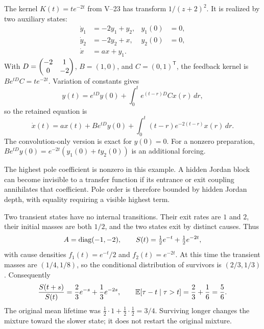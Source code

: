 The kernel $K(t)=te^{-2t}$ from V--23 has transform $1/(z+2)^2$. It is realized by two auxiliary states:
\[
\begin{aligned}
\dot y_1&=-2y_1+y_2,& y_1(0)&=0,\\
\dot y_2&=-2y_2+x,& y_2(0)&=0,\\
\dot x&=a x+y_1.&
\end{aligned}
\]
With $D=\begin{pmatrix}-2&1\\0&-2\end{pmatrix}$, $B=(1,0)$, and $C=(0,1)^{\mathsf T}$, the feedback kernel is $Be^{tD}C=te^{-2t}$.
Variation of constants gives
\[
y(t)=e^{tD}y(0)+\int_0^t e^{(t-r)D}Cx(r)\,dr,
\]
so the retained equation is
\[
\dot x(t)=a x(t)+Be^{tD}y(0)
+\int_0^t (t-r)e^{-2(t-r)}x(r)\,dr.
\]
The convolution-only version is exact for $y(0)=0$. For a nonzero preparation, $Be^{tD}y(0)=e^{-2t}(y_1(0)+t y_2(0))$ is an additional forcing.

The highest pole coefficient is nonzero in this example. A hidden Jordan block can become invisible to a transfer function if its entrance or exit coupling annihilates that coefficient. Pole order is therefore bounded by hidden Jordan depth, with equality requiring a visible highest term.

Two transient states have no internal transitions. Their exit rates are $1$ and $2$, their initial masses are both $1/2$, and the two states exit by distinct causes. Thus
\[
A=\operatorname{diag}(-1,-2),\qquad
S(t)=\tfrac12e^{-t}+\tfrac12e^{-2t},
\]
with cause densities $f_1(t)=e^{-t}/2$ and $f_2(t)=e^{-2t}$.
At this time the transient masses are $(1/4,1/8)$, so the conditional distribution of survivors is $(2/3,1/3)$. Consequently
\[
\frac{S(t+s)}{S(t)}=\frac23e^{-s}+\frac13e^{-2s},
\qquad
\EE[\tau-t\mid\tau>t]=\frac23+\frac16=\frac56.
\]
The original mean lifetime was $\tfrac12\cdot1+\tfrac12\cdot\tfrac12=3/4$. Surviving longer changes the mixture toward the slower state; it does not restart the original mixture.

